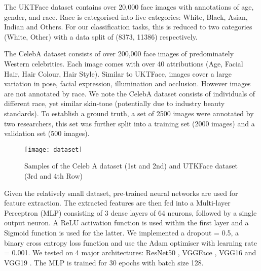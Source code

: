 \documentclass[10pt,twocolumn,letterpaper]{article}
\begin{document}
The UKTFace dataset contains over 20,000 face images with annotations of age, gender, and race. Race is categorised into five categories: White, Black, Asian, Indian and Others. For our classification tasks, this is reduced to two categories (White, Other) with a data split of (8373, 11386) respectively. 

The CelebA dataset consists of over 200,000 face images of predominately Western celebrities. Each image comes with over 40 attributions (Age, Facial Hair, Hair Colour, Hair Style). Similar to UKTFace, images cover a large variation in pose, facial expression, illumination and occlusion. However images are not annotated by race. We note the CelebA dataset consists of individuals of different race, yet similar skin-tone (potentially due to industry beauty standards). To establish a ground truth, a set of 2500 images were annotated by two researchers, this set was further split into a training set (2000 images) and a validation set (500 images). 

\begin{figure}[h!]
\label{fig:long}
\begin{center}
   \texttt{[image: dataset]}
\end{center}
   \caption{\label{Fig: Datasets}Samples of the Celeb A dataset (1st and 2nd) and UTKFace dataset (3rd and 4th Row)}


\end{figure}

Given the relatively small dataset, pre-trained neural networks are used for feature extraction. The extracted features are then fed into a Multi-layer Perceptron (MLP) consisting of 3 dense layers of 64 neurons, followed by a single output neuron. A ReLU activation function is used within the first layer and a Sigmoid function is used for the latter. We implemented a dropout = 0.5, a binary cross entropy loss function and use the Adam optimiser with learning rate = 0.001. We tested on 4 major architectures: ResNet50 \cite{He2015}, VGGFace \cite{Parkhi15}, VGG16 and VGG19 \cite{Simonyan14c}. The MLP is trained for 30 epochs with batch size 128. 

\end{document}
